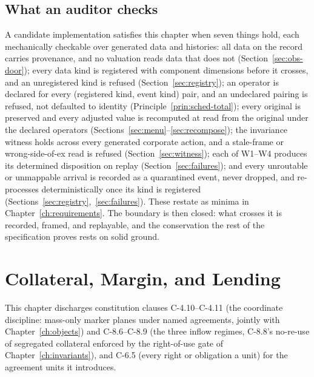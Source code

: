 \documentclass[11pt,a4paper]{article}
\begin{document}
\subsection{What an auditor checks}

A candidate implementation satisfies this chapter when seven things hold, each mechanically
checkable over generated data and histories: all data on the record carries provenance,
and no valuation reads data that does not (Section~\ref{sec:obs-door}); every data kind
is registered with component dimensions before it crosses, and an unregistered kind is
refused (Section~\ref{sec:registry}); an operator is declared for every (registered kind,
event kind) pair, and an undeclared pairing is refused, not defaulted to identity
(Principle~\ref{prin:sched-total}); every original is preserved and every adjusted value is
recomputed at read from the original under the declared operators
(Sections~\ref{sec:menu}--\ref{sec:recompose}); the invariance witness holds across every
generated corporate action, and a stale-frame or wrong-side-of-ex read is refused
(Section~\ref{sec:witness}); each of W1--W4 produces its determined disposition on
replay (Section~\ref{sec:failures}); and every unroutable or unmappable arrival is recorded
as a quarantined event, never dropped, and re-processes deterministically once its kind is
registered (Sections~\ref{sec:registry},~\ref{sec:failures}). These restate as minima in
Chapter~\ref{ch:requirements}. The boundary is then closed: what crosses it is recorded,
framed, and replayable, and the conservation the rest of the specification proves rests on
solid ground.


\section{Collateral, Margin, and Lending}\label{ch:collateral}

This chapter discharges constitution clauses C-4.10--C-4.11 (the coordinate discipline: mass-only marker planes under named agreements, jointly with Chapter~\ref{ch:objects}) and C-8.6--C-8.9 (the three inflow regimes, C-8.8's no-re-use of segregated collateral enforced by the right-of-use gate of Chapter~\ref{ch:invariants}), and C-6.5 (every right or obligation a unit) for the agreement units it introduces.
\end{document}

